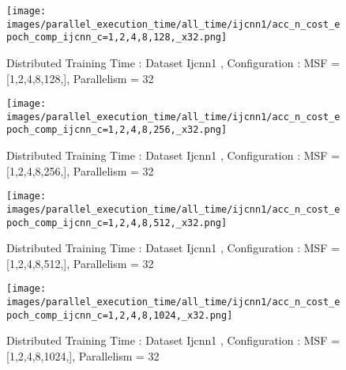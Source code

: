 \begin{figure*}[htbp]
\centering
\texttt{[image: images/parallel\_execution\_time/all\_time/ijcnn1/acc\_n\_cost\_epoch\_comp\_ijcnn\_c=1,2,4,8,128,\_x32.png]}
\caption{Distributed Training Time : Dataset Ijcnn1 , Configuration : MSF = [1,2,4,8,128,], Parallelism = 32}
\label{fig:dis-msf-tr-time-ijcnn1-x32}
\end{figure*}


\begin{figure*}[htbp]
\centering
\texttt{[image: images/parallel\_execution\_time/all\_time/ijcnn1/acc\_n\_cost\_epoch\_comp\_ijcnn\_c=1,2,4,8,256,\_x32.png]}
\caption{Distributed Training Time : Dataset Ijcnn1 , Configuration : MSF = [1,2,4,8,256,], Parallelism = 32}
\label{fig:dis-msf-tr-time-ijcnn1-x32}
\end{figure*}


\begin{figure*}[htbp]
\centering
\texttt{[image: images/parallel\_execution\_time/all\_time/ijcnn1/acc\_n\_cost\_epoch\_comp\_ijcnn\_c=1,2,4,8,512,\_x32.png]}
\caption{Distributed Training Time : Dataset Ijcnn1 , Configuration : MSF = [1,2,4,8,512,], Parallelism = 32}
\label{fig:dis-msf-tr-time-ijcnn1-x32}
\end{figure*}


\begin{figure*}[htbp]
\centering
\texttt{[image: images/parallel\_execution\_time/all\_time/ijcnn1/acc\_n\_cost\_epoch\_comp\_ijcnn\_c=1,2,4,8,1024,\_x32.png]}
\caption{Distributed Training Time : Dataset Ijcnn1 , Configuration : MSF = [1,2,4,8,1024,], Parallelism = 32}
\label{fig:dis-msf-tr-time-ijcnn1-x32}
\end{figure*}


